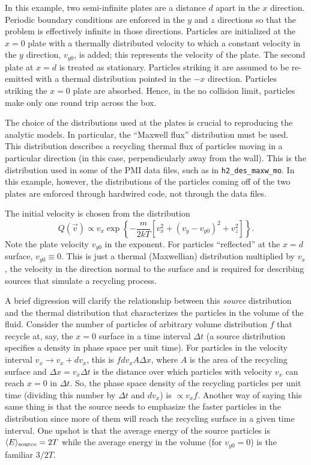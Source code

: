 \documentclass[12pt]{report}
\begin{document}
In this example, two semi-infinite plates are a distance $d$ apart 
in the $x$ direction. 
Periodic boundary conditions are enforced in the $y$ and $z$ directions so that
the problem is effectively infinite in those directions.  Particles
are initialized at the $x = 0$ plate with a thermally distributed
velocity to which a constant velocity in the $y$ direction, 
$v_{y0}$,
is added; this represents the velocity of the plate. The second plate
at $x = d$ is treated as stationary. Particles striking it are assumed to be
re-emitted with a thermal distribution pointed in the $-x$ direction.
Particles striking the $x = 0$ plate are absorbed. Hence, in the no
collision limit, particles make only one round trip across the box.

The choice of the distributions used at the plates is crucial
to reproducing the analytic models. In particular, the ``Maxwell flux''
distribution \cite{Reit92} must be used. This distribution describes a 
recycling thermal flux
of particles moving in a particular direction (in this case, perpendicularly
away from the wall). This is the distribution used in some of the
PMI data files, such as in \verb+h2_des_maxw_mo+. In this example, however,
the distributions of the particles coming off of the two plates 
are enforced through hardwired code,
not through the data files. 

The initial velocity is chosen from the distribution
\begin{equation}
Q(\vec{v}) \propto v_{x}  
\exp \left\{ - \frac{m}{2 k T} 
[v_{x}^{2} + (v_{y} - v_{y0})^{2} + v_{z}^{2}] \right\}.
\label{maxflux}
\end{equation}
Note the plate velocity $v_{y0}$ in the exponent. For particles 
``reflected'' at the $x = d$ surface, $v_{y0} \equiv 0$. This is just a
thermal (Maxwellian) distribution multiplied by $v_{x}$, the velocity in the
direction normal to the surface and is required for describing sources that
simulate a recycling process. 

A brief digression will clarify the relationship between this {\em source} 
distribution and the thermal distribution that characterizes the 
particles in the volume of the fluid. Consider the number of particles
of arbitrary volume distribution $f$
that recycle at, say, the $x = 0$ surface in a time interval $\Delta t$
(a source distribution specifies a density in phase space per unit time).
For particles in the velocity interval $v_{x} \rightarrow v_{x} + dv_{x}$,
this is $f dv_{x} A \Delta x$, where $A$ is the area of the recycling surface
and $\Delta x = v_{x} \Delta t$ is the distance over which particles with
velocity $v_{x}$ can reach $x = 0$ in $\Delta t$. So, the phase space
density of the recycling particles per unit time (dividing this number
by $\Delta t$ and $dv_{x}$) is $\propto v_{x} f$. Another way of saying this
same thing is that the source needs to emphasize the faster particles
in the distribution since more of them will reach the recycling surface in
a given time interval. One upshot is that the average energy of the
source particles is $\langle E \rangle_{\rm source} = 2 T$ while the
average energy in the volume (for $v_{y0} = 0$) is the familiar $3/2 T$.
\end{document}
